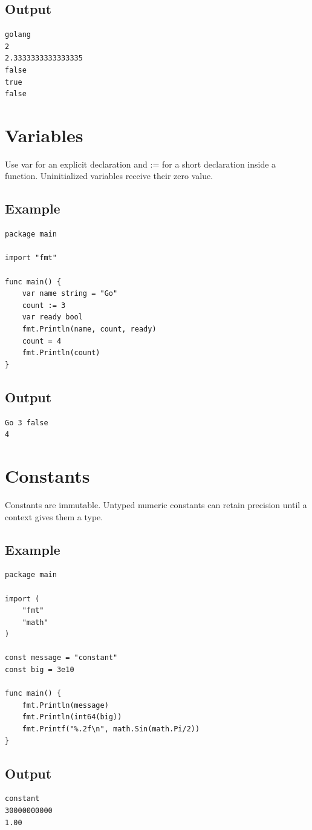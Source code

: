 \documentclass[10pt,oneside]{article}
\newcommand{\sectionline}{\par\vspace{4pt}{\color{rule}\hrule height .5pt}\vspace{7pt}\color{ink}\noindent}
\begin{document}
\subsection*{Output}
\begin{lstlisting}[style=terminal]
golang
2
2.3333333333333335
false
true
false
\end{lstlisting}
\clearpage
\section{Variables}
\sectionline
Use var for an explicit declaration and := for a short declaration inside a function. Uninitialized variables receive their zero value.\par
\subsection*{Example}
\begin{lstlisting}[style=gocode]
package main

import "fmt"

func main() {
	var name string = "Go"
	count := 3
	var ready bool
	fmt.Println(name, count, ready)
	count = 4
	fmt.Println(count)
}
\end{lstlisting}
\subsection*{Output}
\begin{lstlisting}[style=terminal]
Go 3 false
4
\end{lstlisting}
\clearpage
\section{Constants}
\sectionline
Constants are immutable. Untyped numeric constants can retain precision until a context gives them a type.\par
\subsection*{Example}
\begin{lstlisting}[style=gocode]
package main

import (
	"fmt"
	"math"
)

const message = "constant"
const big = 3e10

func main() {
	fmt.Println(message)
	fmt.Println(int64(big))
	fmt.Printf("%.2f\n", math.Sin(math.Pi/2))
}
\end{lstlisting}
\subsection*{Output}
\begin{lstlisting}[style=terminal]
constant
30000000000
1.00
\end{lstlisting}
\clearpage
\end{document}
